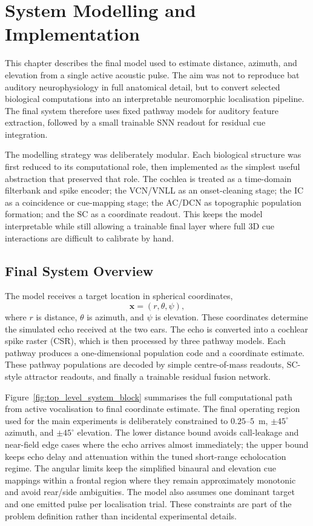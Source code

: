 \chapter{System Modelling and Implementation} \label{ch:modelling}

This chapter describes the final model used to estimate distance, azimuth, and elevation from a single active acoustic pulse. The aim was not to reproduce bat auditory neurophysiology in full anatomical detail, but to convert selected biological computations into an interpretable neuromorphic localisation pipeline. The final system therefore uses fixed pathway models for auditory feature extraction, followed by a small trainable SNN readout for residual cue integration.

The modelling strategy was deliberately modular. Each biological structure was first reduced to its computational role, then implemented as the simplest useful abstraction that preserved that role. The cochlea is treated as a time-domain filterbank and spike encoder; the VCN/VNLL as an onset-cleaning stage; the IC as a coincidence or cue-mapping stage; the AC/DCN as topographic population formation; and the SC as a coordinate readout. This keeps the model interpretable while still allowing a trainable final layer where full 3D cue interactions are difficult to calibrate by hand.

\section{Final System Overview}

The model receives a target location in spherical coordinates,
\begin{equation}
    \mathbf{x} = (r,\theta,\psi),
\end{equation}
where $r$ is distance, $\theta$ is azimuth, and $\psi$ is elevation. These coordinates determine the simulated echo received at the two ears. The echo is converted into a cochlear spike raster (CSR), which is then processed by three pathway models. Each pathway produces a one-dimensional population code and a coordinate estimate. These pathway populations are decoded by simple centre-of-mass readouts, SC-style attractor readouts, and finally a trainable residual fusion network.



Figure~\ref{fig:top_level_system_block} summarises the full computational path from active vocalisation to final coordinate estimate. The final operating region used for the main experiments is deliberately constrained to $0.25$--$5$~m, $\pm45^\circ$ azimuth, and $\pm45^\circ$ elevation. The lower distance bound avoids call-leakage and near-field edge cases where the echo arrives almost immediately; the upper bound keeps echo delay and attenuation within the tuned short-range echolocation regime. The angular limits keep the simplified binaural and elevation cue mappings within a frontal region where they remain approximately monotonic and avoid rear/side ambiguities. The model also assumes one dominant target and one emitted pulse per localisation trial. These constraints are part of the problem definition rather than incidental experimental details.

